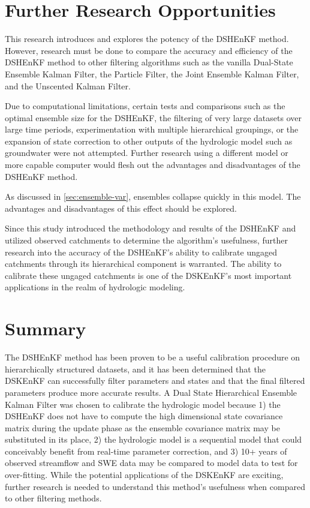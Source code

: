 \section{Further Research Opportunities}

This research introduces and explores the potency of the DSHEnKF method. However, research must be done to compare the accuracy and efficiency of the DSHEnKF method to other filtering algorithms such as the vanilla Dual-State Ensemble Kalman Filter, the Particle Filter, the Joint Ensemble Kalman Filter, and the Unscented Kalman Filter.

Due to computational limitations, certain tests and comparisons such as the optimal ensemble size for the DSHEnKF, the filtering of very large datasets over large time periods, experimentation with multiple hierarchical groupings, or the expansion of state correction to other outputs of the hydrologic model such as groundwater were not attempted. Further research using a different model or more capable computer would flesh out the advantages and disadvantages of the DSHEnKF method.

As discussed in \autoref{sec:ensemble-var}, ensembles collapse quickly in this model. The advantages and disadvantages of this effect should be explored.

Since this study introduced the methodology and results of the DSHEnKF and utilized observed catchments to determine the algorithm's usefulness, further research into the accuracy of the DSHEnKF's ability to calibrate ungaged catchments through its hierarchical component is warranted. The ability to calibrate these ungaged catchments is one of the DSKEnKF's most important applications in the realm of hydrologic modeling.

\section{Summary}
The DSHEnKF method has been proven to be a useful calibration procedure on hierarchically structured datasets, and it has been determined that the DSKEnKF can successfully filter parameters and states and that the final filtered parameters produce more accurate results.  A Dual State Hierarchical Ensemble Kalman Filter was chosen to calibrate the hydrologic model because 1) the DSHEnKF does not have to compute the high dimensional state covariance matrix during the update phase as the ensemble covariance matrix may be substituted in its place, 2) the hydrologic model is a sequential model that could conceivably benefit from real-time parameter correction, and 3) 10+ years of observed streamflow and SWE data may be compared to model data to test for over-fitting. While the potential applications of the DSKEnKF are exciting, further research is needed to understand this method's usefulness when compared to other filtering methods.